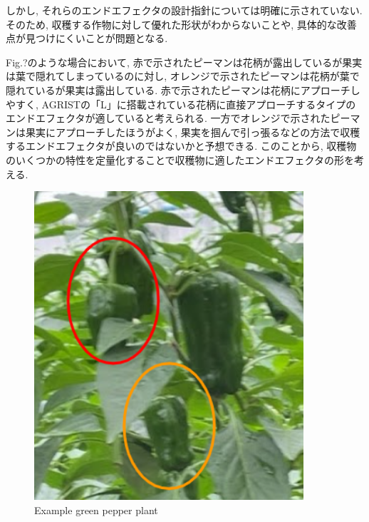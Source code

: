 しかし, それらのエンドエフェクタの設計指針については明確に示されていない.
そのため, 収穫する作物に対して優れた形状がわからないことや, 具体的な改善点が見つけにくいことが問題となる.

\vspace{5mm}

Fig.?のような場合において, 赤で示されたピーマンは花柄が露出しているが果実は葉で隠れてしまっているのに対し, オレンジで示されたピーマンは花柄が葉で隠れているが果実は露出している.
赤で示されたピーマンは花柄にアプローチしやすく, AGRISTの「L」に搭載されている花柄に直接アプローチするタイプのエンドエフェクタが適していると考えられる.
一方でオレンジで示されたピーマンは果実にアプローチしたほうがよく, 果実を掴んで引っ張るなどの方法で収穫するエンドエフェクタが良いのではないかと予想できる.
このことから, 収穫物のいくつかの特性を定量化することで収穫物に適したエンドエフェクタの形を考える.

\vspace{5mm}
\begin{figure}[H]
     \centering
     \includegraphics[width=100mm]{images/png/plantex.png}
     \caption{Example green pepper plant}
     \label{Fig:plantex}
   \end{figure}



\newpage
